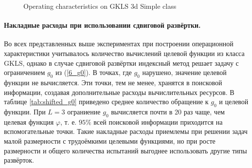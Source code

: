 \documentclass[runningheads]{llncs}
\begin{document}
\begin{figure}[ht]
    \centering
    \caption{Operating characteristics on GKLS 3d Simple class}
\end{figure}

\paragraph{Накладные расходы при использовании сдвиговой развёртки.}
Во всех представленных выше экспериментах при построении операционной характеристики учитывалось количество вычислений целевой функции из класса GKLS, однако в случае сдвиговой развёртки индексный метод решает задачу с ограничением \(g_0\) из (\ref{6_g0}). В точках, где \(g_0\) нарушено, значение целевой функции не вычисляется. Эти точки, тем не менее, хранятся в поисковой информации, создавая дополнительные расходы вычислительных ресурсов. В таблице \ref{tab:shifted_g0} приведено среднее количество обращение к \(g_0\) и целевой функции. При \(L=3\) ограниение \(g_0\) вычисляется почти в 20 раз чаще, чем целевая функция \(\varphi\), т. е. \(95\%\) всей поисковой информации приходится на вспомогательные точки. Такие накладные расходы приемлемы при решении задач малой размерности с трудоёмкими целевыми функциями, но при росте размерности и общего количества испытаний выгоднее использовать другие типы развёрток.
\end{document}
